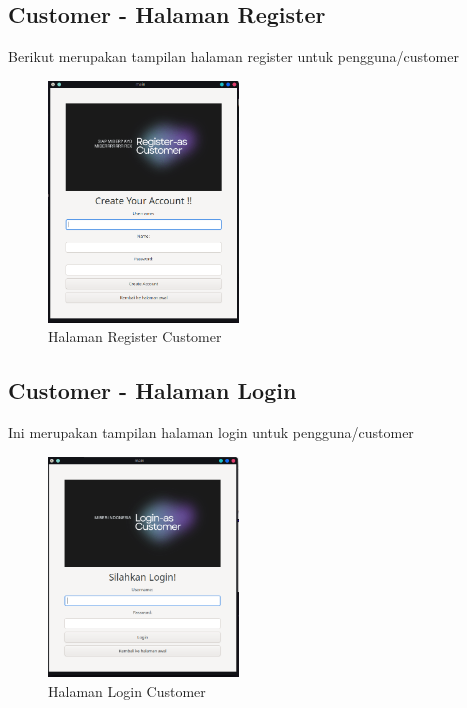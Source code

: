 \documentclass[a4paper,12pt]{article}
\begin{document}
\subsection{Customer - Halaman Register}
Berikut merupakan tampilan halaman register untuk pengguna/customer
\begin{figure}[!htbp]
    \centering
    \includegraphics[width=0.45\textwidth]{./Register.png}
    \caption{Halaman Register Customer}

\end{figure}
\FloatBarrier 

\subsection{Customer - Halaman Login}
Ini merupakan tampilan halaman login untuk pengguna/customer
\begin{figure}[!htbp]
    \centering
    \includegraphics[width=0.45\textwidth]{./Login.png}
    \caption{Halaman Login Customer}

\end{figure}
\FloatBarrier 
\end{document}
